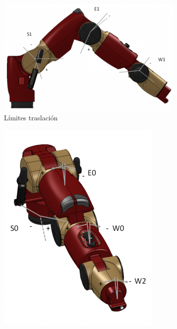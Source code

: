 \begin{figure}[]
	\centering
	\begin{subfigure}[b]{0.4\textwidth}
		\includegraphics[trim=0 0 0 10, clip, width=\textwidth]{imagenes/metodos/baxter_range_motion1.png}
		\caption{Límites traslación}
		\label{fig:metodos/limits1}
	\end{subfigure}
	\begin{subfigure}[b]{0.4\textwidth}
		\includegraphics[width=\textwidth]{imagenes/metodos/baxter_range_motion2.png}

\end{subfigure}
\end{figure}

